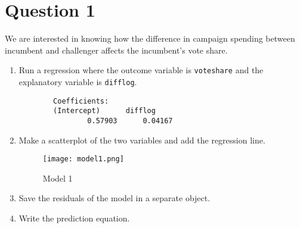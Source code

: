 \documentclass[12pt,letterpaper]{article}
\begin{document}
\section*{Question 1}
\vspace{.25cm}
\noindent We are interested in knowing how the difference in campaign spending between incumbent and challenger affects the incumbent's vote share. 
	\begin{enumerate}
		\item Run a regression where the outcome variable is \texttt{voteshare} and the explanatory variable is \texttt{difflog}.	
		
		  
		\begin{verbatim}
		Coefficients:
		(Intercept)      difflog  
				0.57903      0.04167  
		\end{verbatim}
		\vspace{2cm}
		\item Make a scatterplot of the two variables and add the regression line. 	
		 
		\begin{figure}[h!]
			\caption{\footnotesize{Model 1 }}
			\vspace{.5cm}
			\centering
			\label{fig:Model 1"}			
			\texttt{[image: model1.png]}
		\end{figure}		
		\vspace{2cm}
		\item Save the residuals of the model in a separate object.	
		 
		\vspace{2cm}
		\item Write the prediction equation.
		 
	\end{enumerate}
	\vspace{.5cm}
\newpage
\end{document}
